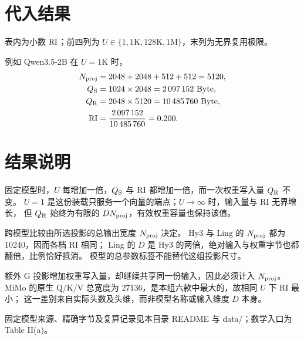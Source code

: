 \section{代入结果}
表内为小数 $\mathrm{RI}$；前四列为 $U\in\{1,1\mathrm{K},128\mathrm{K},1\mathrm{M}\}$，末列为无界复用极限。
\begin{center}\small\end{center}
\DisplayNote
例如 Qwen3.5-2B 在 $U=1\mathrm{K}$ 时，
\[
\begin{aligned}
N_{\rm proj}&=2048+2048+512+512=5120,\\
Q_{\mathrm S}&=1024\times2048=2\,097\,152\ \mathrm{Byte},\\
Q_{\mathrm R}&=2048\times5120=10\,485\,760\ \mathrm{Byte},\\
\mathrm{RI}&=\frac{2\,097\,152}{10\,485\,760}=0.200.
\end{aligned}
\]

\section{结果说明}
固定模型时，$U$ 每增加一倍，$Q_{\mathrm S}$ 与 $\mathrm{RI}$ 都增加一倍，而一次权重写入量 $Q_{\mathrm R}$ 不变。
$U=1$ 是这份装载只服务一个向量的端点；$U\to\infty$ 时，输入量与 RI 无界增长，
但 $Q_{\mathrm R}$ 始终为有限的 $DN_{\rm proj}$，有效权重容量也保持该值。

跨模型比较由所选投影的总输出宽度 $N_{\rm proj}$ 决定。
Hy3 与 Ling 的 $N_{\rm proj}$ 都为 10240，因而各档 RI 相同；
Ling 的 $D$ 是 Hy3 的两倍，绝对输入与权重字节也都翻倍，比例恰好抵消。
模型的总参数标签不能替代这组投影尺寸。

额外 G 投影增加权重写入量，却继续共享同一份输入，因此必须计入 $N_{\rm proj}$。
MiMo 的原生 Q/K/V 总宽度为 27136，是本组六款中最大的，故相同 $U$ 下 RI 最小；
这一差别来自实际头数及头维，而非模型名称或输入维度 $D$ 本身。

\par\smallskip\noindent\small
固定模型来源、精确字节及复算记录见本目录 README 与 data/；数学入口为 Table II(a)。


